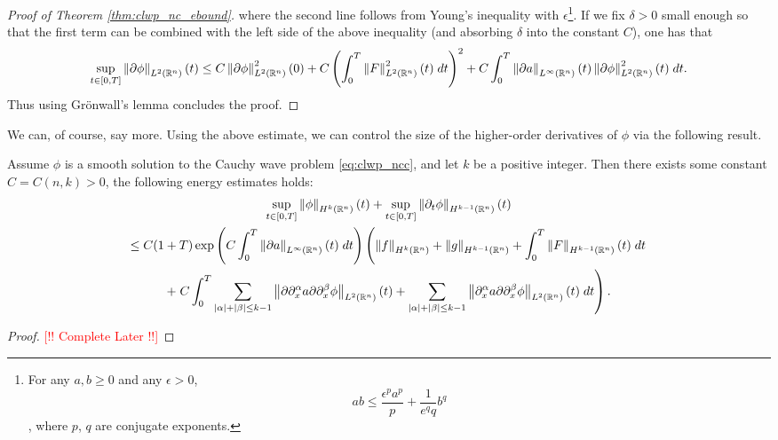 \documentclass{article}
\begin{document}
\begin{proof}[Proof of Theorem \ref{thm:clwp_nc_ebound}]
	where the second line follows from Young's inequality with $\epsilon$\footnote{For any $a, b \geq 0$ and any $\epsilon > 0$, $$ab \leq \frac{\epsilon^{p}a^{p}}{p} + \frac{1}{e^{q}q}b^{q}$$, where $p$, $q$ are conjugate exponents.}. If we fix $\delta > 0$ small enough so that the first term can be combined with the left side of the above inequality (and absorbing $\delta$ into the constant $C$), one has that 
	\begin{align*}
		\begin{split}
			\sup_{t \in [0,T]}\left\Vert \partial \phi \right\Vert_{L^{2}(\mathbb{R}^{n})}(t) \leq C\left\Vert \partial \phi \right\Vert_{L^{2}(\mathbb{R}^{n})}^{2}(0) + C\left(\int_{0}^{T}\left\Vert F \right\Vert_{L^{2}(\mathbb{R}^{n})}^{2}(t)\;dt\right)^{2} + C\int_{0}^{T}\left\Vert \partial a \right\Vert_{L^{\infty}(\mathbb{R}^{n})}(t)\left\Vert \partial \phi \right\Vert^{2}_{L^{2}(\mathbb{R}^{n})}(t)\;dt.
		\end{split}
	\end{align*}
	Thus using Gr\"onwall's lemma concludes the proof. 
\end{proof}

We can, of course, say more. Using the above estimate, we can control the size of the higher-order derivatives of $\phi$ via the following result. 

\begin{prop}
	Assume $\phi$ is a smooth solution to the Cauchy wave problem \ref{eq:clwp_ncc}, and let $k$ be a positive integer. Then there exists some constant $C = C(n,k) > 0$, the following energy estimates holds: 
	\begin{multline}
		\sup_{t\in[0,T]}\left\Vert \phi \right\Vert_{H^{k}(\mathbb{R}^{n})}(t) + \sup_{t \in [0,T]}\left\Vert \partial_{t}\phi \right\Vert_{H^{k -1}(\mathbb{R}^{n})}(t) \\ \leq C(1 + T)\exp\left(C\int_{0}^{T}\left\Vert \partial a \right\Vert_{L^{\infty}(\mathbb{R}^{n})}(t)\;dt\right)\left(\left\Vert f \right\Vert_{H^{k}(\mathbb{R}^{n})} 
		+ \left\Vert g \right\Vert_{H^{k - 1}(\mathbb{R}^{n})} + \int_{0}^{T}\left\Vert F \right\Vert_{H^{k - 1}(\mathbb{R}^{n})}(t)\;dt\right.\\ + \left. C\int_{0}^{T}\sum_{|\alpha| + |\beta| \leq k - 1}\left\Vert \partial\partial_{x}^{\alpha}a\partial\partial_{x}^{\beta}\phi \right\Vert_{L^{2}(\mathbb{R}^{n})}(t) + \sum_{|\alpha| + |\beta| \leq k- 1}\left\Vert \partial_{x}^{\alpha}a\partial\partial_{x}^{\beta}\phi \right\Vert_{L^{2}(\mathbb{R}^{n})}(t)\;dt\right). 
		\label{eq:cor49}
	\end{multline}
\end{prop}
\begin{proof}
	\textcolor{red}{[!! Complete Later !!]}
\end{proof}
\end{document}

